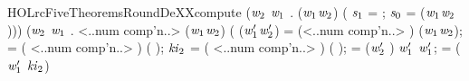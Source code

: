 \newcommand{\HOLrcFiveTheoremsRoundDeXXaltXXhalfXXmessageDe}{\UseVerbatim{HOLrcFiveTheoremsRoundDeXXaltXXhalfXXmessageDe}}
\begin{SaveVerbatim}{HOLrcFiveTheoremsRoundDeXXcompute}
\HOLTokenTurnstile{} (\HOLSymConst{\HOLTokenForall{}}\ensuremath{\HOLBoundVar{w}\sb{\mathrm{2}}} \ensuremath{\HOLBoundVar{w}\sb{\mathrm{1}}} .
         (\ensuremath{\HOLBoundVar{w}\sb{\mathrm{1}}}\HOLSymConst{,}\ensuremath{\HOLBoundVar{w}\sb{\mathrm{2}}}) \HOLSymConst{=}
      ( \ensuremath{\HOLBoundVar{s}\sb{\mathrm{1}}} =   ; \ensuremath{\HOLBoundVar{s}\sb{\mathrm{0}}} =     (\ensuremath{\HOLBoundVar{w}\sb{\mathrm{1}}}\HOLSymConst{,}\ensuremath{\HOLBoundVar{w}\sb{\mathrm{2}}}))) \HOLSymConst{\HOLTokenConj{}}
   (\HOLSymConst{\HOLTokenForall{}}\ensuremath{\HOLBoundVar{w}\sb{\mathrm{2}}} \ensuremath{\HOLBoundVar{w}\sb{\mathrm{1}}}  .
       <..num comp'n..>  (\ensuremath{\HOLBoundVar{w}\sb{\mathrm{1}}}\HOLSymConst{,}\ensuremath{\HOLBoundVar{w}\sb{\mathrm{2}}}) \HOLSymConst{=}
      (
         (\ensuremath{\HOLBoundVar{w}\sb{\mathrm{1}}\sp{\prime{}}}\HOLSymConst{,}\ensuremath{\HOLBoundVar{w}\sb{\mathrm{2}}\sp{\prime{}}}) =  (<..num comp'n..> \HOLSymConst{\ensuremath{-}} )  (\ensuremath{\HOLBoundVar{w}\sb{\mathrm{1}}}\HOLSymConst{,}\ensuremath{\HOLBoundVar{w}\sb{\mathrm{2}}});
          =  ( \HOLSymConst{\HOLTokenProd{}} <..num comp'n..> \HOLSymConst{\ensuremath{-}} ) ( );
         \ensuremath{\HOLBoundVar{ki}\sb{\mathrm{2}}} =  ( \HOLSymConst{\HOLTokenProd{}} <..num comp'n..> \HOLSymConst{\ensuremath{-}} ) ( );
          = (\ensuremath{\HOLBoundVar{w}\sb{\mathrm{2}}\sp{\prime{}}} \HOLSymConst{\ensuremath{-}} ) \HOLSymConst{\HOLTokenRor{}}  \ensuremath{\HOLBoundVar{w}\sb{\mathrm{1}}\sp{\prime{}}} \HOLSymConst{\HOLTokenEor{}} \ensuremath{\HOLBoundVar{w}\sb{\mathrm{1}}\sp{\prime{}}};
          = (\ensuremath{\HOLBoundVar{w}\sb{\mathrm{1}}\sp{\prime{}}} \HOLSymConst{\ensuremath{-}} \ensuremath{\HOLBoundVar{ki}\sb{\mathrm{2}}}) \HOLSymConst{\HOLTokenRor{}}   \HOLSymConst{\HOLTokenEor{}} 

\end{SaveVerbatim}
